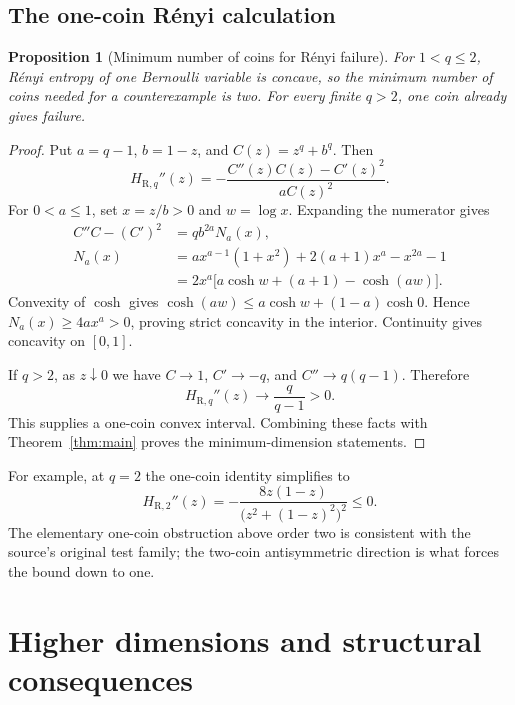 \documentclass[11pt]{article}
\numberwithin{equation}{section}
\newtheorem{proposition}[theorem]{Proposition}
\theoremstyle{definition}
\theoremstyle{remark}
\begin{document}
\subsection{The one-coin R\'enyi calculation}
\begin{proposition}[Minimum number of coins for R\'enyi failure]
\label{prop:minimalrenyi}
For $1<q\leq2$, R\'enyi entropy of one Bernoulli variable is concave, so the
minimum number of coins needed for a counterexample is two. For every
finite $q>2$, one coin already gives failure.
\end{proposition}
\begin{proof}
Put $a=q-1$, $b=1-z$, and $C(z)=z^q+b^q$. Then
\[
 H_{\mathrm R,q}''(z)
 =-\frac{C''(z)C(z)-C'(z)^2}{aC(z)^2}.
\]
For $0<a\leq1$, set $x=z/b>0$ and $w=\log x$. Expanding the numerator gives
\begin{align}
 C''C-(C')^2
 &=q b^{2a}N_a(x),\\
 N_a(x)&=a x^{a-1}(1+x^2)+2(a+1)x^a-x^{2a}-1\\
 &=2x^a\bigl[a\cosh w+(a+1)-\cosh(aw)\bigr].
\end{align}
Convexity of $\cosh$ gives
$\cosh(aw)\leq a\cosh w+(1-a)\cosh0$.
Hence $N_a(x)\geq4a x^a>0$, proving strict concavity in the interior.
Continuity gives concavity on $[0,1]$.

If $q>2$, as $z\downarrow0$ we have
$C\to1$, $C'\to-q$, and $C''\to q(q-1)$. Therefore
\[
 H_{\mathrm R,q}''(z)\longrightarrow\frac q{q-1}>0.
\]
This supplies a one-coin convex interval. Combining these facts with
Theorem~\ref{thm:main} proves the minimum-dimension statements.
\end{proof}

For example, at $q=2$ the one-coin identity simplifies to
\[
 H_{\mathrm R,2}''(z)
 =-\frac{8z(1-z)}{\bigl(z^2+(1-z)^2\bigr)^2}\leq0.
\]
The elementary one-coin obstruction above order two is consistent with the
source's original test family; the two-coin antisymmetric direction is what
forces the bound down to one.


\section{Higher dimensions and structural consequences}
\end{document}
